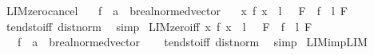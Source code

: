 \begin{isabellebody}
{\isafoldproof}%
%
\isadelimproof
\isanewline
%
\endisadelimproof
\isanewline
{}\isamarkupfalse%
\ LIM{\isacharunderscore}{\kern0pt}zero{\isacharunderscore}{\kern0pt}cancel{\isacharcolon}{\kern0pt}\isanewline
\ \ \ f\ {\isacharcolon}{\kern0pt}{\isacharcolon}{\kern0pt}\ {\isachardoublequoteopen}{\isacharprime}{\kern0pt}a\ {\isasymRightarrow}\ {\isacharprime}{\kern0pt}b{\isacharcolon}{\kern0pt}{\isacharcolon}{\kern0pt}real{\isacharunderscore}{\kern0pt}normed{\isacharunderscore}{\kern0pt}vector{\isachardoublequoteclose}\isanewline
\ \ \ {\isachardoublequoteopen}{\isacharparenleft}{\kern0pt}{\isacharparenleft}{\kern0pt}{\isasymlambda}x{\isachardot}{\kern0pt}\ f\ x\ {\isacharminus}{\kern0pt}\ l{\isacharparenright}{\kern0pt}\ {\isasymlonglongrightarrow}\ {}{\isacharparenright}{\kern0pt}\ F\ {\isasymLongrightarrow}\ {\isacharparenleft}{\kern0pt}f\ {\isasymlonglongrightarrow}\ l{\isacharparenright}{\kern0pt}\ F{\isachardoublequoteclose}\isanewline
%
\isadelimproof
%
\endisadelimproof
%
\isatagproof
{}\isamarkupfalse%
\ tendsto{\isacharunderscore}{\kern0pt}iff\ dist{\isacharunderscore}{\kern0pt}norm\ \isamarkupfalse%
\ simp%
\endisatagproof
{\isafoldproof}%
%
\isadelimproof
\isanewline
%
\endisadelimproof
\isanewline
{}\isamarkupfalse%
\ LIM{\isacharunderscore}{\kern0pt}zero{\isacharunderscore}{\kern0pt}iff{\isacharcolon}{\kern0pt}\ {\isachardoublequoteopen}{\isacharparenleft}{\kern0pt}{\isacharparenleft}{\kern0pt}{\isasymlambda}x{\isachardot}{\kern0pt}\ f\ x\ {\isacharminus}{\kern0pt}\ l{\isacharparenright}{\kern0pt}\ {\isasymlonglongrightarrow}\ {}{\isacharparenright}{\kern0pt}\ F\ {\isacharequal}{\kern0pt}\ {\isacharparenleft}{\kern0pt}f\ {\isasymlonglongrightarrow}\ l{\isacharparenright}{\kern0pt}\ F{\isachardoublequoteclose}\isanewline
\ \ \ f\ {\isacharcolon}{\kern0pt}{\isacharcolon}{\kern0pt}\ {\isachardoublequoteopen}{\isacharprime}{\kern0pt}a\ {\isasymRightarrow}\ {\isacharprime}{\kern0pt}b{\isacharcolon}{\kern0pt}{\isacharcolon}{\kern0pt}real{\isacharunderscore}{\kern0pt}normed{\isacharunderscore}{\kern0pt}vector{\isachardoublequoteclose}\isanewline
%
\isadelimproof
\ \ %
\endisadelimproof
%
\isatagproof
{}\isamarkupfalse%
\ tendsto{\isacharunderscore}{\kern0pt}iff\ dist{\isacharunderscore}{\kern0pt}norm\ \isamarkupfalse%
\ simp%
\endisatagproof
{\isafoldproof}%
%
\isadelimproof
\isanewline
%
\endisadelimproof
\isanewline
{}\isamarkupfalse%
\ LIM{\isacharunderscore}{\kern0pt}imp{\isacharunderscore}{\kern0pt}LIM{\isacharcolon}{\kern0pt}\isanewline

\end{isabellebody}
